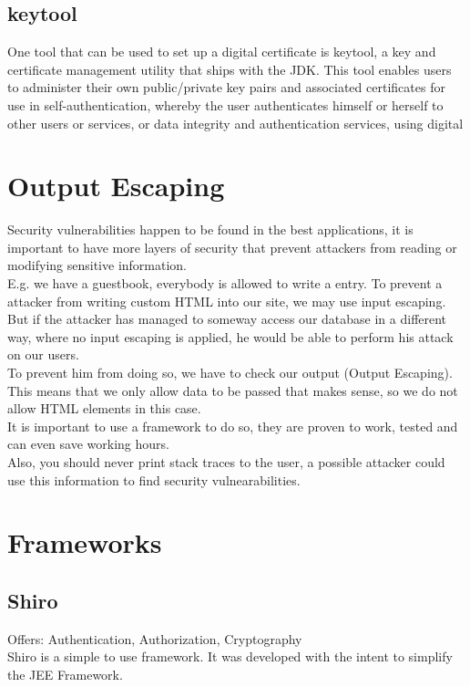\documentclass[12pt,a4paper]{report}
\begin{document}
\section{keytool}
One tool that can be used to set up a digital certificate is keytool, a key and certificate management utility that ships with the JDK. This tool enables users to administer their own public/private key pairs and associated certificates for use in self-authentication, whereby the user authenticates himself or herself to other users or services, or data integrity and authentication services, using digital 

\chapter{Output Escaping}
Security vulnerabilities happen to be found in the best applications, it is important to have more layers of security that prevent attackers from reading or modifying sensitive information.\\
E.g. we have a guestbook, everybody is allowed to write a entry. To prevent a attacker from writing custom HTML into our site, we may use input escaping. But if the attacker has managed to someway access our database in a different way, where no input escaping is applied, he would be able to perform his attack on our users.\\
To prevent him from doing so, we have to check our output (Output Escaping). This means that we only allow data to be passed that makes sense, so we do not allow HTML elements in this case.\\
It is important to use a framework to do so, they are proven to work, tested and can even save working hours.\\
Also, you should never print stack traces to the user, a possible attacker could use this information to find security vulnearabilities.

\chapter{Frameworks}
\section{Shiro}
Offers: Authentication, Authorization, Cryptography\\
Shiro is a simple to use framework. It was developed with the intent to simplify the JEE Framework.\\\\
\end{document}

